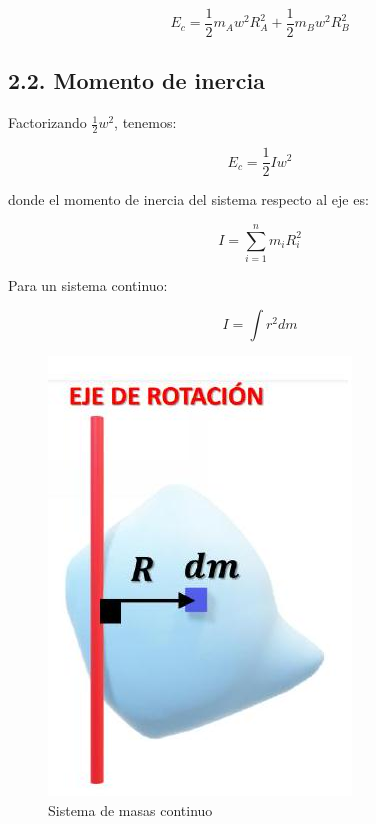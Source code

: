 \documentclass{article}
\begin{document}
\begin{equation*}
E_{c} = \frac{1}{2} m_{A} w^{2} R_{A}^{2} + \frac{1}{2} m_{B} w^{2} R_{B}^{2}
\end{equation*}

\subsection*{2.2. Momento de inercia}
Factorizando $\frac{1}{2} w^{2}$, tenemos:

\begin{equation*}
E_{c} = \frac{1}{2} I w^{2}
\end{equation*}

donde el momento de inercia del sistema respecto al eje es:

\begin{equation*}
I = \sum_{i=1}^{n} m_{i} R_{i}^{2}
\end{equation*}

Para un sistema continuo:

\begin{equation*}
I = \int r^{2} dm
\end{equation*}

\begin{figure}[H]
    \centering
    \includegraphics[scale=0.30]{2025_04_01_ea720b93e8ebb5d0c6aeg-05}
    \caption{Sistema de masas continuo}
\end{figure}
\end{document}
